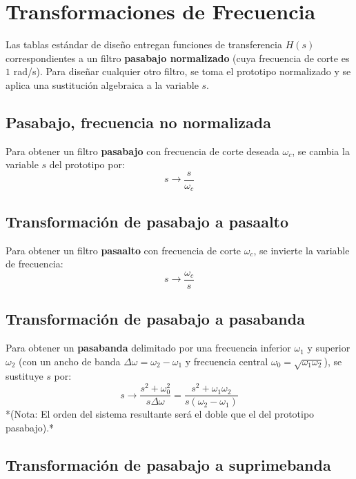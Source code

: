 \documentclass[11pt,a4paper,openany]{book}
\begin{document}
\section{Transformaciones de Frecuencia}

Las tablas estándar de diseño entregan funciones de transferencia $H(s)$ correspondientes a un filtro \textbf{pasabajo normalizado} (cuya frecuencia de corte es $1$ rad/s). Para diseñar cualquier otro filtro, se toma el prototipo normalizado y se aplica una sustitución algebraica a la variable $s$.

\subsection{Pasabajo, frecuencia no normalizada}

Para obtener un filtro \textbf{pasabajo} con frecuencia de corte deseada $\omega_c$, se cambia la variable $s$ del prototipo por:
\begin{equation}
	s \longrightarrow \frac{s}{\omega_c}
\end{equation}

\subsection{Transformaci\'{o}n de pasabajo a pasaalto}

Para obtener un filtro \textbf{pasaalto} con frecuencia de corte $\omega_c$, se invierte la variable de frecuencia:
\begin{equation}
	s \longrightarrow \frac{\omega_c}{s}
\end{equation}

\subsection{Transformaci\'{o}n de pasabajo a pasabanda}

Para obtener un \textbf{pasabanda} delimitado por una frecuencia inferior $\omega_1$ y superior $\omega_2$ (con un ancho de banda $\Delta\omega = \omega_2 - \omega_1$ y frecuencia central $\omega_0 = \sqrt{\omega_1 \omega_2}$), se sustituye $s$ por:
\begin{equation}
	s \longrightarrow \frac{s^2 + \omega_0^2}{s \Delta\omega} = \frac{s^2 + \omega_1 \omega_2}{s (\omega_2 - \omega_1)}
\end{equation}
*(Nota: El orden del sistema resultante será el doble que el del prototipo pasabajo).*

\subsection{Transformaci\'{o}n de pasabajo a suprimebanda}
\end{document}
